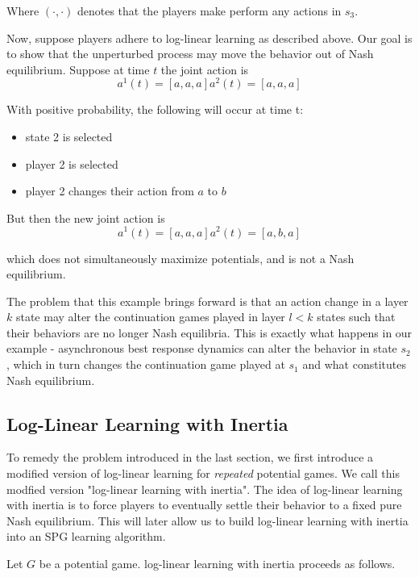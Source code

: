 \begin{eg}
Where $(\cdot, \cdot)$ denotes that the players make perform any actions in $s_3$. 

Now, suppose players adhere to log-linear learning as described above. Our goal is to show that the unperturbed process may move the behavior out of Nash equilibrium. Suppose at time $t$ the joint action is
$$
a^1(t) = [a, a, a]
a^2(t) = [a, a, a]
$$

With positive probability, the following will occur at time t:
\begin{itemize}
\item state 2 is selected
\item player 2 is selected
\item player 2 changes their action from $a$ to $b$
\end{itemize}

But then the new joint action is
$$
a^1(t) = [a, a, a]
a^2(t) = [a, b, a]
$$

which does not simultaneously maximize potentials, and is not a Nash equilibrium.

\end{eg}

The problem that this example brings forward is that an action change in a layer $k$ state may alter the continuation games played in layer $l < k$ states such that their behaviors are no longer Nash equilibria. This is exactly what happens in our example - asynchronous best response dynamics can alter the behavior in state $s_2$, which in turn changes the continuation game played at $s_1$ and what constitutes Nash equilibrium.



\subsection{Log-Linear Learning with Inertia}

To remedy the problem introduced in the last section, we first introduce a modified version of log-linear learning for {\em repeated} potential games. We call this modfied version "log-linear learning with inertia". The idea of log-linear learning with inertia is to force players to eventually settle their behavior to a fixed pure Nash equilibrium. This will later allow us to build log-linear learning with inertia into an SPG learning algorithm. 

Let $G$ be a potential game. log-linear learning with inertia proceeds as follows.

